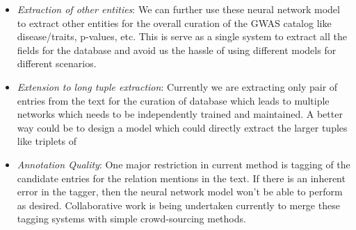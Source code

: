 \begin{itemize}
    \item \emph{Extraction of other entities}:
    We can further use these neural network model to extract other entities for the overall curation of the GWAS catalog like disease/traits, p-values, etc. This is serve as a single system to extract all the fields for the database and avoid us the hassle of using different models for different scenarios. 
    
    \item \emph{Extension to long tuple extraction}:
    Currently we are extracting only pair of entries from the text for the curation of database which leads to multiple networks which needs to be independently trained and maintained. A better way could be to design a model which could directly extract the larger tuples like triplets of {\it <stage, ethnicity, sample size>}
    
    \item \emph{Annotation Quality}: 
    One major restriction in current method is tagging of the candidate entries for the relation mentions in the text. If there is an inherent error in the tagger, then the neural network model won't be able to perform as desired. Collaborative work is being undertaken currently to merge these tagging systems with simple crowd-sourcing methods. 
\end{itemize}